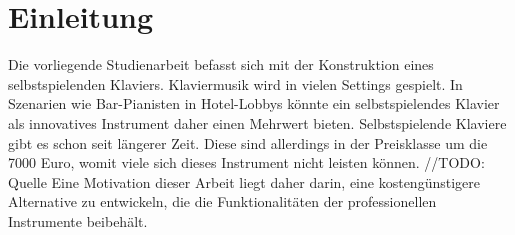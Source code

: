 \chapter{Einleitung} \label{einleitung}

\nocite{*}

Die vorliegende Studienarbeit befasst sich mit der Konstruktion eines selbstspielenden Klaviers.
Klaviermusik wird in vielen Settings gespielt.
In Szenarien wie Bar-Pianisten in Hotel-Lobbys könnte ein selbstspielendes
Klavier als innovatives Instrument daher einen Mehrwert bieten. \newline
Selbstspielende Klaviere gibt es schon seit längerer Zeit.
Diese sind allerdings in der Preisklasse um die 7000 Euro, womit viele sich dieses Instrument nicht leisten können. //TODO: Quelle
Eine Motivation dieser Arbeit liegt daher darin, eine kostengünstigere Alternative zu entwickeln, die die
Funktionalitäten der professionellen Instrumente beibehält.




